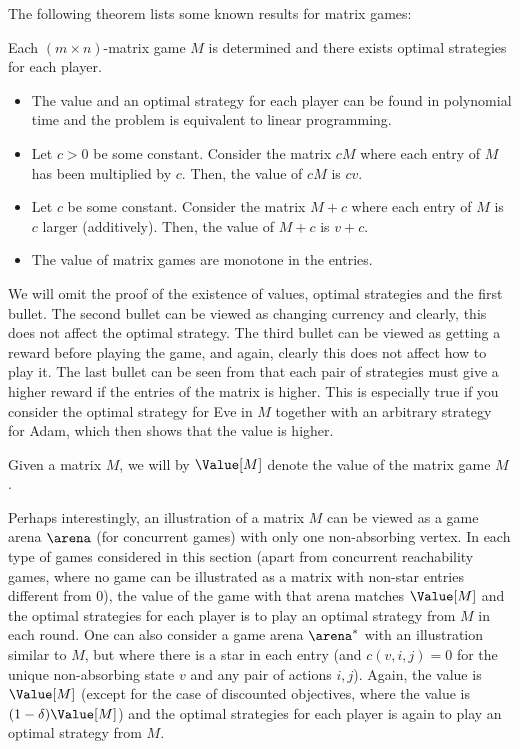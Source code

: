 The following theorem lists some known results for matrix games:
\begin{theorem}\label{lem:mat}
Each $(m\times n)$-matrix game $M$ is determined and there exists optimal strategies for each player. 
\begin{itemize}
\item The value and an optimal strategy for each player can be found in polynomial time and the problem is equivalent to linear programming.

\item Let $c>0$ be some constant. Consider the matrix $cM$ where each entry of $M$ has been multiplied by $c$. Then, the value of $cM$ is $cv$.
\item Let $c$ be some constant. Consider the matrix $M+c$ where each entry of $M$ is $c$ larger (additively). Then, the value of $M+c$ is $v+c$.
\item The value of matrix games are monotone in the entries.
\end{itemize}
\end{theorem}
We will omit the proof of the existence of values, optimal strategies and the first bullet.
The second bullet can be viewed as changing currency and clearly, this does not affect the optimal strategy.
The third bullet can be viewed as getting a reward before playing the game, and again, clearly this does not affect how to play it.
The last bullet can be seen from that each pair of strategies must give a higher reward if the entries of the matrix is higher.
This is especially true if you consider the optimal strategy for Eve in $M$ together with an arbitrary strategy for Adam, which then shows that the value is higher.


Given a matrix $M$, we will by $\Value[M]$ denote the value of the matrix game $M$. 

Perhaps interestingly, an illustration of a matrix $M$ can be viewed as a game arena $\arena$ (for concurrent games) with only one non-absorbing vertex. In each type of games considered in this section (apart from concurrent reachability games, where no game can be illustrated as a matrix with non-star entries different from 0), the value of the game with that arena matches $\Value[M]$ and the optimal strategies for each player is to play an optimal strategy from $M$ in each round. One can also consider a game arena $\arena^*$ with an illustration similar to $M$, but where there is a star in each entry (and $c(v,i,j)=0$ for the unique non-absorbing state $v$ and any pair of actions $i,j$).
Again, the value is $\Value[M]$ (except for the case of discounted objectives, where the value is $(1-\delta)\Value[M]$) and the optimal strategies for each player is again to play an optimal strategy from $M$. 

